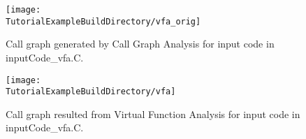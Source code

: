 \begin{figure}
\texttt{[image: \\TutorialExampleBuildDirectory/vfa\_orig]}
\caption{Call graph generated by Call Graph Analysis for input code in inputCode\_vfa.C.}
\label{Tutorial:exampleVFA_OrigGraph}
\end{figure}


\begin{figure}
\texttt{[image: \\TutorialExampleBuildDirectory/vfa]}
\caption{Call graph resulted from Virtual Function Analysis for input code in inputCode\_vfa.C.}
\label{Tutorial:exampleVFA_Graph}
\end{figure}




